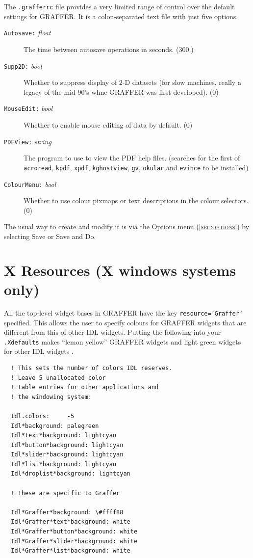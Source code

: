 \documentclass[11pt,twoside,english]{article}
\begin{document}
The \texttt{.grafferrc} file provides a very limited range of control
over the default settings for GRAFFER. It is a colon-separated text
file with just five options.
\begin{description}
\item[\texttt{Autosave:} \textit{float}] The time between autosave
  operations in seconds. (300.)
\item[\texttt{Supp2D:} \textit{bool}] Whether to suppress display of
  2-D datasets (for slow machines, really a legacy of the
  mid-90's whne GRAFFER was first developed). (0)
\item[\texttt{MouseEdit:} \textit{bool}] Whether to enable mouse
  editing of data by default. (0)
\item[\texttt{PDFView:} \textit{string}] The program to use to view the
  PDF help files. (searches for the first of \texttt{acroread},
  \texttt{kpdf}, \texttt{xpdf}, \texttt{kghostview}, \texttt{gv},
  \texttt{okular} and \texttt{evince} to be installed)
\item[\texttt{ColourMenu:} \textit{bool}] Whether to use colour pixmaps
  or text descriptions in the colour selectors. (0)
\end{description}
The usual way to create and modify it is via the \textsf{Options} menu
(\textsc{\autoref{sec:options}}) by selecting \textsf{Save} or \textsf{Save
  and Do}.

\section{X Resources (X windows systems only)}

All the top-level widget bases in GRAFFER have the key
\texttt{resource='Graffer'} specified. This allows the user to specify
colours for GRAFFER widgets that are different from this of other IDL
widgets. Putting the following into your \texttt{.Xdefaults} makes
{}``lemon yellow'' GRAFFER widgets and light green widgets for other
IDL widgets .

\begin{verbatim}
  ! This sets the number of colors IDL reserves.
  ! Leave 5 unallocated color
  ! table entries for other applications and 
  ! the windowing system:

  Idl.colors:     -5
  Idl*background: palegreen
  Idl*text*background: lightcyan
  Idl*button*background: lightcyan
  Idl*slider*background: lightcyan
  Idl*list*background: lightcyan
  Idl*droplist*background: lightcyan

  ! These are specific to Graffer

  Idl*Graffer*background: \#ffff88
  Idl*Graffer*text*background: white
  Idl*Graffer*button*background: white
  Idl*Graffer*slider*background: white
  Idl*Graffer*list*background: white
\end{verbatim}
\end{document}
